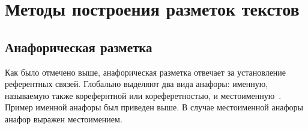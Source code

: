 


\chapter{Методы построения разметок текстов}
\section{Анафорическая разметка}

Как было отмечено выше, анафорическая разметка отвечает за установление референтных связей. Глобально выделяют два вида анафоры: именную, называемую также корефернтной или кореферетностью, и местоименную~\cite{sokolov2017razrabotka}. Пример именной анафоры был приведен выше. В случае местоименной анафоры анафор выражен местоимением.

